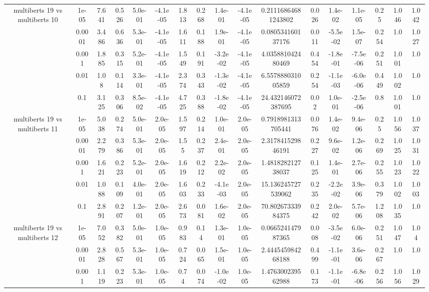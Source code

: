 \begin{tabular}{|c|c|c|c|c|c|c|c|c|c|c|c|c|c|c|c|c|}
\hline
\multirow{5}{*}{multiberts 19 vs multiberts 10} & 1e-05 & 7.641 & 0.526 & 5.0e-01 & -4.1e-05 & 1.813 & 0.268 & 1.4e-01 & -4.1e-05 & 0.21116864681243802 & 0.026 & 1.4e-02 & 1.1e-05 & 0.25 & 1.046 & 1.042 \\
 & 0.0001 & 3.486 & 0.636 & 5.3e-01 & -4.1e-05 & 1.611 & 0.188 & 1.9e-01 & -4.1e-05 & 0.080534160137176 & 0.011 & -5.5e-02 & 1.5e-07 & 0.254 & 1.0 & 1.027 \\
 & 0.001 & 1.885 & 0.315 & 5.2e-01 & -4.1e-05 & 1.549 & 0.191 & -3.2e-02 & -4.1e-05 & 4.035881042480469 & 0.454 & -1.8e-01 & -7.5e-06 & 0.251 & 1.001 & 1.0 \\
 & 0.01 & 1.08 & 0.114 & 3.3e-01 & -4.1e-05 & 2.374 & 0.343 & -1.3e-02 & -4.1e-05 & 6.557888031005859 & 0.254 & -1.1e-03 & -6.0e-06 & 0.449 & 1.002 & 1.0 \\
 & 0.1 & 3.125 & 0.306 & 8.5e-02 & -4.1e-05 & 4.725 & 0.388 & -1.8e-02 & -4.1e-05 & 24.432146072387695 & 0.02 & 1.0e-01 & -2.5e-06 & 0.8 & 1.001 & 1.0 \\
\hline
\multirow{5}{*}{multiberts 19 vs multiberts 11} & 1e-05 & 5.038 & 0.274 & 5.0e-01 & 2.0e-05 & 1.597 & 0.214 & 1.0e-01 & 2.0e-05 & 0.7918981313705441 & 0.076 & 1.4e-02 & 9.4e-06 & 0.25 & 1.056 & 1.037 \\
 & 0.0001 & 2.279 & 0.386 & 5.3e-01 & 2.0e-05 & 1.55 & 0.237 & 2.4e-01 & 2.0e-05 & 2.317841529846191 & 0.227 & 9.6e-02 & 1.2e-06 & 0.269 & 1.025 & 1.031 \\
 & 0.001 & 1.621 & 0.223 & 5.2e-01 & 2.0e-05 & 1.619 & 0.212 & 2.2e-02 & 2.0e-05 & 1.481828212738037 & 0.125 & 1.4e-01 & 2.7e-06 & 0.255 & 1.023 & 1.022 \\
 & 0.01 & 1.088 & 0.109 & 4.0e-01 & 2.0e-05 & 1.603 & 0.233 & -4.1e-03 & 2.0e-05 & 15.136245727539062 & 0.235 & -2.2e-02 & 3.9e-06 & 0.379 & 1.002 & 1.003 \\
 & 0.1 & 2.891 & 0.207 & 1.2e-01 & 2.0e-05 & 2.673 & 0.081 & 1.6e-02 & 2.0e-05 & 70.80267333984375 & 0.242 & 2.0e-02 & 5.7e-06 & 1.208 & 1.035 & 1.0 \\
\hline
\multirow{5}{*}{multiberts 19 vs multiberts 12} & 1e-05 & 7.052 & 0.382 & 5.0e-01 & 1.0e-05 & 0.983 & 0.14 & 1.3e-01 & 1.0e-05 & 0.066524147987365 & 0.008 & -3.5e-02 & 6.0e-06 & 0.251 & 1.047 & 1.04 \\
 & 0.0001 & 2.828 & 0.567 & 5.3e-01 & 1.0e-05 & 0.724 & 0.065 & 1.5e-01 & 1.0e-05 & 2.444545984268188 & 0.499 & -1.1e-01 & 3.6e-06 & 0.267 & 1.0 & 1.0 \\
 & 0.001 & 1.119 & 0.223 & 5.3e-01 & 1.0e-05 & 0.74 & 0.074 & -1.0e-02 & 1.0e-05 & 1.476300239562988 & 0.173 & -1.1e-01 & -6.8e-06 & 0.256 & 1.056 & 1.029 \\

\end{tabular}
